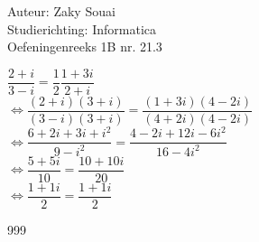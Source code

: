 \documentclass[a4paper]{article}
\begin{document}
  
\noindent \large Auteur: Zaky Souai \\
\noindent \large Studierichting:  Informatica\\
\noindent \large Oefeningenreeks 1B nr. 21.3\\

\bigskip

\normalsize

$\dfrac{2 + i}{3 - i} = \dfrac{1}{2} \dfrac{1 + 3i}{2 + i}$\\

$\Leftrightarrow\dfrac{(2 + i)(3 + i)}{(3 - i)(3 + i)} = \dfrac{(1 + 3i)(4 - 2i)}{(4 + 2i)(4 - 2i)}$\\

$\Leftrightarrow\dfrac{6 + 2i + 3i + i^2}{9 - i^2} = \dfrac{4 - 2i + 12i - 6i^2}{16 - 4i^2}$\\

$\Leftrightarrow\dfrac{5 + 5i}{10} = \dfrac{10 + 10i}{20}$\\

$\Leftrightarrow\dfrac{1 + 1i}{2} = \dfrac{1 + 1i}{2}$\\






\begin{thebibliography}{999}
\end{thebibliography}
\end{document}
